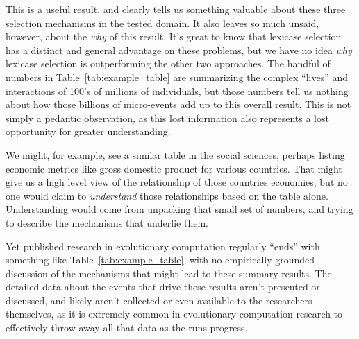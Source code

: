 This is a useful result, and clearly tells us something valuable about
these three selection mechanisms in the tested domain. It also leaves
so much unsaid, however, about the \emph{why} of this result. It's great
to know that lexicase selection has a distinct and general advantage on 
these problems, but we have no idea \emph{why} lexicase selection is
outperforming the other two approaches. The handful of numbers in
Table~\ref{tab:example_table} are summarizing the complex ``lives'' 
and interactions of 100's of millions of individuals, but those numbers
tell us nothing about how those billions of micro-events add up to this
overall result. This is not simply a pedantic observation, as this lost 
information also represents a lost opportunity for greater understanding. 

We might, for example, see a similar table in the social sciences, 
perhaps listing economic metrics like gross domestic product for 
various countries. That might give us a high level view of the relationship
of those countries economies, but no one would claim to \emph{understand}
those relationships based on the table alone. Understanding would come
from unpacking that small set of numbers, and trying to describe the
mechanisms that underlie them. 

Yet published research in evolutionary
computation regularly ``ends'' with something like 
Table~\ref{tab:example_table}, with no empirically grounded discussion 
of the mechanisms that might lead to these summary results. The detailed
data about the events that drive these results aren't presented or discussed,
and likely aren't collected or even available to the researchers themselves, 
as it is extremely common in evolutionary computation research 
to effectively throw away all that data as the runs progress.


